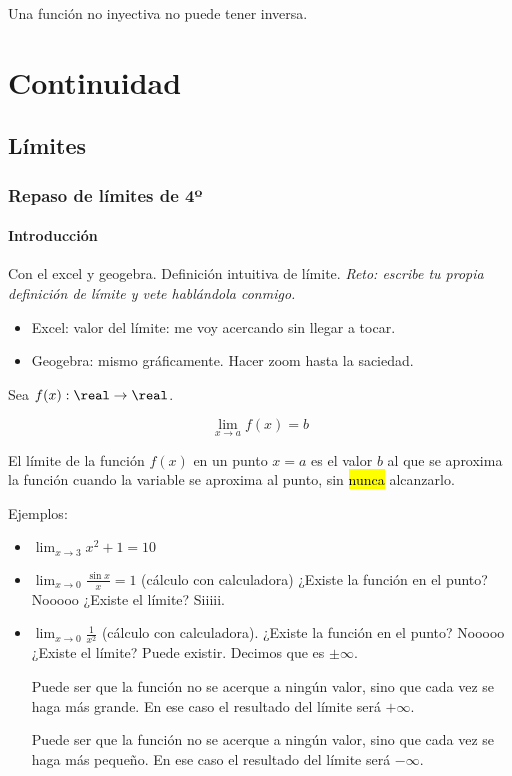 \obs Una función no inyectiva no puede tener inversa.

\section{Continuidad}
\subsection{Límites}

\subsubsection{Repaso de límites de 4º}

\paragraph{Introducción}

Con el excel y geogebra. Definición intuitiva de límite. \textit{Reto: escribe tu propia definición de límite y vete hablándola conmigo.}

\begin{itemize}
	\item Excel: valor del límite: me voy acercando sin llegar a tocar.
	\item Geogebra: mismo gráficamente. Hacer zoom hasta la saciedad.
\end{itemize}

\begin{defn}
Sea $f(x):\real\to\real$.

\[\lim_{x\to a} f(x) = b\]

El límite de la función $f(x)$ en un punto $x=a$ es el valor $b$ al que se aproxima la función cuando la variable se aproxima al punto, sin \hl{nunca} alcanzarlo.
\end{defn}

Ejemplos:
\begin{itemize}
	\item $\lim_{x\to 3} x^2 + 1 = 10$
	\item $\lim_{x\to 0} \frac{\sin x}{x} = 1$ (cálculo con calculadora) ¿Existe la función en el punto? Nooooo ¿Existe el límite? Siiiii.
	\item $\lim_{x\to 0} \frac{1}{x^2}$ (cálculo con calculadora). ¿Existe la función en el punto? Nooooo ¿Existe el límite? Puede existir. Decimos que es $\pm\infty$.

\obs Puede ser que la función no se acerque a ningún valor, sino que cada vez se haga más grande. En ese caso el resultado del límite será $+\infty$.

\obs Puede ser que la función no se acerque a ningún valor, sino que cada vez se haga más pequeño. En ese caso el resultado del límite será $-\infty$.
\end{itemize}


